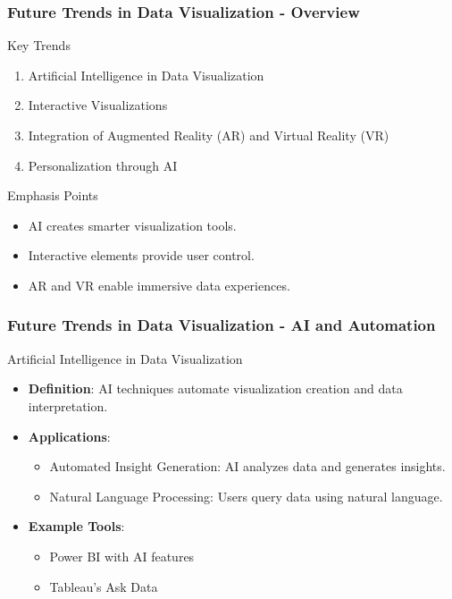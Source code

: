 \documentclass[aspectratio=169]{beamer}
\begin{document}
\begin{frame}[fragile]
    \frametitle{Future Trends in Data Visualization - Overview}
    \begin{block}{Key Trends}
        \begin{enumerate}
            \item Artificial Intelligence in Data Visualization
            \item Interactive Visualizations
            \item Integration of Augmented Reality (AR) and Virtual Reality (VR)
            \item Personalization through AI
        \end{enumerate}
    \end{block}
    \begin{block}{Emphasis Points}
        \begin{itemize}
            \item AI creates smarter visualization tools.
            \item Interactive elements provide user control.
            \item AR and VR enable immersive data experiences.
        \end{itemize}
    \end{block}
\end{frame}

\begin{frame}[fragile]
    \frametitle{Future Trends in Data Visualization - AI and Automation}
    \begin{block}{Artificial Intelligence in Data Visualization}
        \begin{itemize}
            \item \textbf{Definition}: AI techniques automate visualization creation and data interpretation.
            \item \textbf{Applications}:
                \begin{itemize}
                    \item Automated Insight Generation: AI analyzes data and generates insights.
                    \item Natural Language Processing: Users query data using natural language.
                \end{itemize}
            \item \textbf{Example Tools}: 
                \begin{itemize}
                    \item Power BI with AI features
                    \item Tableau's Ask Data
                \end{itemize}
        \end{itemize}
    \end{block}
\end{frame}
\end{document}
